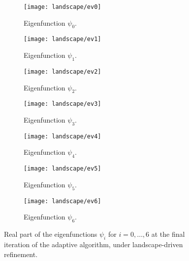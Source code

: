 \begin{figure}[htbp]
    \begin{subfigure}[t]{0.49\textwidth}
        \centering
        \texttt{[image: landscape/ev0]}
        \caption{Eigenfunction \(\psi_0\).}
        \label{fig:eigenfunction_0}
    \end{subfigure}
    \begin{subfigure}[t]{0.49\textwidth}
        \centering
        \texttt{[image: landscape/ev1]}
        \caption{Eigenfunction \(\psi_1\).}
        \label{fig:eigenfunction_1}
    \end{subfigure}
    \vspace{1cm}
    \begin{subfigure}[t]{0.49\textwidth}
        \centering
        \texttt{[image: landscape/ev2]}
        \caption{Eigenfunction \(\psi_2\).}
        \label{fig:eigenfunction_2}
    \end{subfigure}
    \begin{subfigure}[t]{0.49\textwidth}
        \centering
        \texttt{[image: landscape/ev3]}
        \caption{Eigenfunction \(\psi_3\).}
        \label{fig:eigenfunction_3}
    \end{subfigure}
    \vspace{1cm}
    \begin{subfigure}[t]{0.49\textwidth}
        \centering
        \texttt{[image: landscape/ev4]}
        \caption{Eigenfunction \(\psi_4\).}
        \label{fig:eigenfunction_4}
    \end{subfigure}
    \begin{subfigure}[t]{0.49\textwidth}
        \centering
        \texttt{[image: landscape/ev5]}
        \caption{Eigenfunction \(\psi_5\).}
        \label{fig:eigenfunction_5}
    \end{subfigure}
    \vspace{1cm}
    \begin{subfigure}[t]{0.49\textwidth}
        \centering
        \texttt{[image: landscape/ev6]}
        \caption{Eigenfunction \(\psi_6\).}
        \label{fig:eigenfunction_6}
    \end{subfigure}
    \caption{Real part of the eigenfunctions \(\psi_i\) for \(i = 0, \ldots, 6\) at the final iteration of the adaptive algorithm, under landscape-driven refinement.}
\end{figure}


